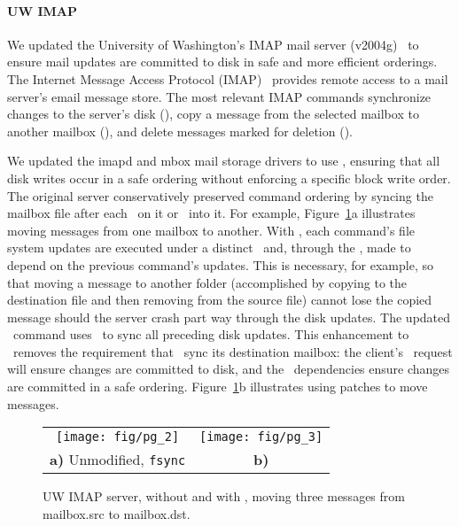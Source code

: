 \paragraph{UW IMAP}
\label{sec:patchgroup:uwimap}

We updated the University of Washington's IMAP mail server
(v2004g)~\cite{uwimap} to ensure mail updates are committed to disk
in safe and more efficient orderings.
%
The Internet Message Access Protocol (IMAP)~\cite{rfc3501} provides
remote access to a mail server's email message store.
%
The most relevant IMAP commands synchronize changes to the server's
disk (\imapCheck), copy a message from the selected mailbox to another
mailbox (\imapCopy), and delete messages marked for deletion (\imapExpunge).

We updated the imapd and mbox mail storage drivers to use
\patchgroups, ensuring that all disk writes occur in a safe ordering
without enforcing a specific block write order.
%
The original server conservatively preserved command ordering by
syncing the mailbox file after each \imapCheck\ on it or \imapCopy\ into it.
%
For example, Figure~\ref{fig:imap}a illustrates moving messages from
one mailbox to another.
%
With \patchgroups, each command's file system updates are executed under a
distinct \patchgroup\ and, through the \patchgroup, made to depend on the
previous command's updates. This is necessary, for example, so that
moving a message to another folder (accomplished by copying to the
destination file and then removing from the source file) cannot lose
the copied message should the server crash part way through the disk
updates.
%
The updated \imapCheck\ command uses \pgSync\ to sync all preceding disk
updates. This enhancement to \imapCheck\ removes the requirement that \imapCopy\
sync its destination mailbox: the client's \imapCheck\ request will ensure
changes are committed to disk, and the \patchgroup\ dependencies ensure
changes are committed in a safe ordering.
%
Figure~\ref{fig:imap}b illustrates using patches to move messages.

\begin{figure}[tb]
\centering
\begin{tabular}{@{}cc@{}}
\texttt{[image: fig/pg\_2]} & 
\texttt{[image: fig/pg\_3]}\\
\textbf{a)} Unmodified, \texttt{fsync} & 
\textbf{b)} \Patchgroups
\end{tabular}
\caption{UW IMAP server, without and with \patchgroups, moving three
messages from mailbox.src to mailbox.dst.}
\label{fig:imap}
\end{figure}

